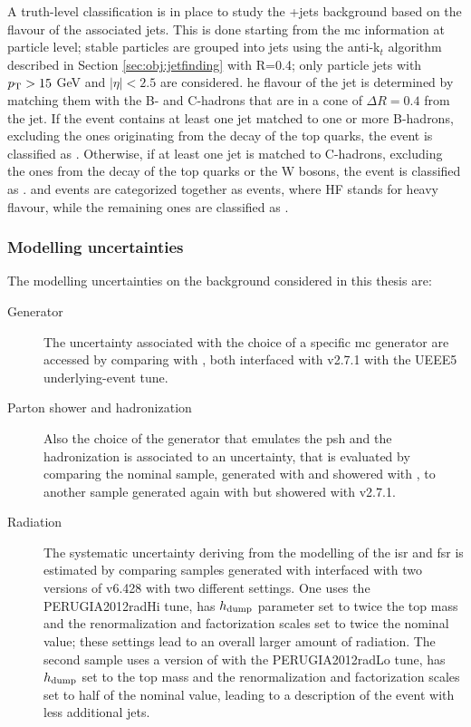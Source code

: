 A truth-level classification is in place to study the \ttbar+jets background based on the flavour of the associated jets.
This is done starting from the \gls{mc} information at particle level; stable particles are grouped into jets using the anti-k$_t$ algorithm 
described in Section \ref{sec:obj:jetfinding} with R=0.4; only particle jets with $p_{\rm T} > 15$ GeV and $|\eta|<2.5$ are considered. 
he flavour of the jet is determined by matching them with the B- and C-hadrons that are in a cone of $\Delta R = 0.4$ from the jet. 
If the event contains at least one jet matched to one or more B-hadrons, excluding the ones originating from the decay of the top quarks, the event 
is classified as \ttbb. Otherwise, if at least one jet is matched to C-hadrons, excluding the ones from the decay of the top quarks or the W bosons, the event is classified as \ttcc. \ttbb and \ttbb events are categorized together as \tthf events, where HF stands for heavy flavour, while the remaining ones are classified as \ttlight.


\subsubsection*{Modelling uncertainties}

The modelling uncertainties on the \ttbar background considered in this thesis are:
\begin{description}
\item[Generator] The uncertainty associated with the choice of a specific \gls{mc} generator are accessed by comparing \PowhegBox with \aNLO, both interfaced with \HWpp v2.7.1 with the UEEE5 underlying-event tune.

\item[Parton shower and hadronization] Also the choice of the generator that emulates the \gls{psh} and the hadronization is associated to an uncertainty, that is evaluated by comparing the nominal sample, generated with \PowhegBox and showered with \PY, to another sample generated again with \PowhegBox but showered with \HWpp v2.7.1. 

\item[Radiation] The systematic uncertainty deriving from the modelling of the \gls{isr} and \gls{fsr} is estimated by comparing samples
generated with \PowhegBox interfaced with two versions of \PY v6.428 with two different settings. One uses the PERUGIA2012radHi tune, has $h_{\rm{dump}}$ parameter set to twice the top mass and the renormalization and factorization scales set to twice the nominal value; these settings lead to an overall larger amount of radiation. The second sample uses a version of \PY with the PERUGIA2012radLo tune, has $h_{\rm{dump}}$ set to the top mass and the renormalization and factorization scales set to half of the nominal value, leading to a description of the event with less additional jets.

\end{description}

